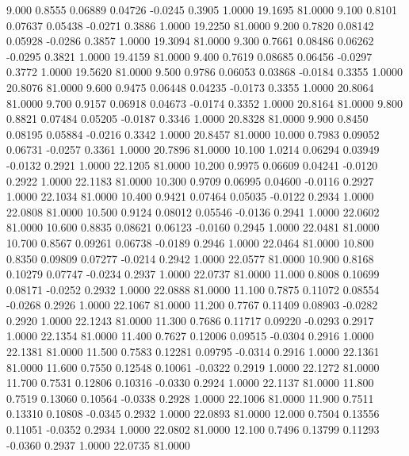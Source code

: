    9.000   0.8555   0.06889   0.04726  -0.0245   0.3905   1.0000  19.1695  81.0000
   9.100   0.8101   0.07637   0.05438  -0.0271   0.3886   1.0000  19.2250  81.0000
   9.200   0.7820   0.08142   0.05928  -0.0286   0.3857   1.0000  19.3094  81.0000
   9.300   0.7661   0.08486   0.06262  -0.0295   0.3821   1.0000  19.4159  81.0000
   9.400   0.7619   0.08685   0.06456  -0.0297   0.3772   1.0000  19.5620  81.0000
   9.500   0.9786   0.06053   0.03868  -0.0184   0.3355   1.0000  20.8076  81.0000
   9.600   0.9475   0.06448   0.04235  -0.0173   0.3355   1.0000  20.8064  81.0000
   9.700   0.9157   0.06918   0.04673  -0.0174   0.3352   1.0000  20.8164  81.0000
   9.800   0.8821   0.07484   0.05205  -0.0187   0.3346   1.0000  20.8328  81.0000
   9.900   0.8450   0.08195   0.05884  -0.0216   0.3342   1.0000  20.8457  81.0000
  10.000   0.7983   0.09052   0.06731  -0.0257   0.3361   1.0000  20.7896  81.0000
  10.100   1.0214   0.06294   0.03949  -0.0132   0.2921   1.0000  22.1205  81.0000
  10.200   0.9975   0.06609   0.04241  -0.0120   0.2922   1.0000  22.1183  81.0000
  10.300   0.9709   0.06995   0.04600  -0.0116   0.2927   1.0000  22.1034  81.0000
  10.400   0.9421   0.07464   0.05035  -0.0122   0.2934   1.0000  22.0808  81.0000
  10.500   0.9124   0.08012   0.05546  -0.0136   0.2941   1.0000  22.0602  81.0000
  10.600   0.8835   0.08621   0.06123  -0.0160   0.2945   1.0000  22.0481  81.0000
  10.700   0.8567   0.09261   0.06738  -0.0189   0.2946   1.0000  22.0464  81.0000
  10.800   0.8350   0.09809   0.07277  -0.0214   0.2942   1.0000  22.0577  81.0000
  10.900   0.8168   0.10279   0.07747  -0.0234   0.2937   1.0000  22.0737  81.0000
  11.000   0.8008   0.10699   0.08171  -0.0252   0.2932   1.0000  22.0888  81.0000
  11.100   0.7875   0.11072   0.08554  -0.0268   0.2926   1.0000  22.1067  81.0000
  11.200   0.7767   0.11409   0.08903  -0.0282   0.2920   1.0000  22.1243  81.0000
  11.300   0.7686   0.11717   0.09220  -0.0293   0.2917   1.0000  22.1354  81.0000
  11.400   0.7627   0.12006   0.09515  -0.0304   0.2916   1.0000  22.1381  81.0000
  11.500   0.7583   0.12281   0.09795  -0.0314   0.2916   1.0000  22.1361  81.0000
  11.600   0.7550   0.12548   0.10061  -0.0322   0.2919   1.0000  22.1272  81.0000
  11.700   0.7531   0.12806   0.10316  -0.0330   0.2924   1.0000  22.1137  81.0000
  11.800   0.7519   0.13060   0.10564  -0.0338   0.2928   1.0000  22.1006  81.0000
  11.900   0.7511   0.13310   0.10808  -0.0345   0.2932   1.0000  22.0893  81.0000
  12.000   0.7504   0.13556   0.11051  -0.0352   0.2934   1.0000  22.0802  81.0000
  12.100   0.7496   0.13799   0.11293  -0.0360   0.2937   1.0000  22.0735  81.0000
